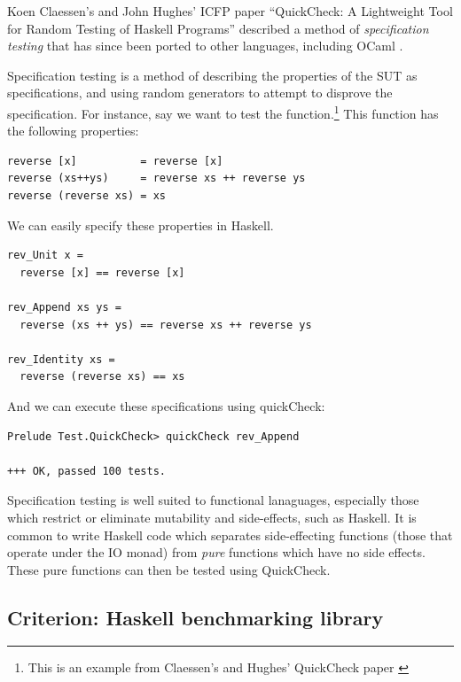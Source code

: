 Koen Claessen's and John Hughes' ICFP paper ``QuickCheck: A
Lightweight Tool for Random Testing of Haskell Programs''
\cite{claessen:quickcheck} described a method of \textit{specification
  testing} that has since been ported to other languages, including
OCaml \cite{code:ocaml-quickcheck} \cite{www:kaputt}.

Specification testing is a method of describing the properties of the
SUT as specifications, and using random generators to attempt to
disprove the specification. For instance, say we want to test the
 function.\footnote{This is an example from Claessen's
  and Hughes' QuickCheck paper \cite{claessen:quickcheck}} This
function has the following properties:

\footnotesize
\begin{verbatim}
reverse [x]          = reverse [x]
reverse (xs++ys)     = reverse xs ++ reverse ys
reverse (reverse xs) = xs
\end{verbatim}
\normalsize

We can easily specify these properties in Haskell.

\begin{lstlisting}[code=Haskell]
rev_Unit x =
  reverse [x] == reverse [x]

rev_Append xs ys =
  reverse (xs ++ ys) == reverse xs ++ reverse ys

rev_Identity xs =
  reverse (reverse xs) == xs
\end{lstlisting}

And we can execute these specifications using quickCheck:

\footnotesize
\begin{verbatim}
Prelude Test.QuickCheck> quickCheck rev_Append

+++ OK, passed 100 tests.
\end{verbatim}
\normalsize

Specification testing is well suited to functional lanaguages,
especially those which restrict or eliminate mutability and
side-effects, such as Haskell. It is common to write Haskell code
which separates side-effecting functions (those that operate under the
IO monad) from \textit{pure} functions which have no side
effects. These pure functions can then be tested using QuickCheck. 

\subsection{Criterion: Haskell benchmarking library}

